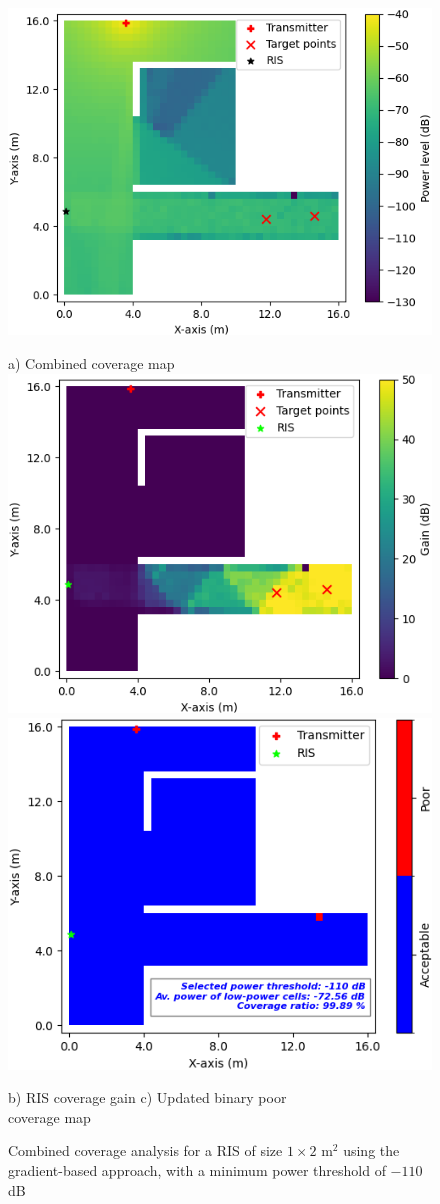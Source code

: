 \documentclass{IEEEoj}
\begin{document}
\begin{figure}
	\centering
	\includegraphics[width=0.7\linewidth]{Sim_Results/Comb_cov_1x2_Gradient_-110dB.png}
	
	a) Combined coverage map \\[5pt]
	
	\includegraphics[width=0.49\linewidth]{Sim_Results/RIS_cov_gain_1x2_Gradient_-110dB.png}
	\hfill
	\includegraphics[width=0.48\linewidth]{Sim_Results/New_Binary_Cov_Map_1x2_Gradient_-110dB.png}
	
	\hspace{10pt} b) RIS coverage gain \hspace{30pt} c) Updated binary poor \\ \hspace{140pt} coverage map
	\caption{Combined coverage analysis for a RIS of size $1 \times 2$ m$^2$ using the gradient-based approach, with a minimum power threshold of $-110$ dB}
	\label{comb_cov_gradient_-110dB}
\end{figure}
\end{document}
